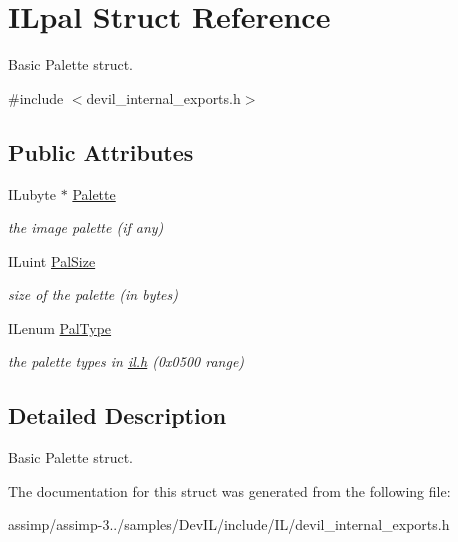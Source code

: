 \hypertarget{struct_i_lpal}{\section{I\+Lpal Struct Reference}
\label{struct_i_lpal}
}


Basic Palette struct.  




{\ttfamily \#include $<$devil\+\_\+internal\+\_\+exports.\+h$>$}

\subsection*{Public Attributes}
\begin{DoxyCompactItemize}
\item 
\hypertarget{struct_i_lpal_abc8ce06b53b2ca4de6bf2ebda303d746}{I\+Lubyte $\ast$ \hyperlink{struct_i_lpal_abc8ce06b53b2ca4de6bf2ebda303d746}{Palette}}\label{struct_i_lpal_abc8ce06b53b2ca4de6bf2ebda303d746}

\begin{DoxyCompactList}\small\item\em the image palette (if any) \end{DoxyCompactList}\item 
\hypertarget{struct_i_lpal_a0e64a8c7d3cdd2e63b60c947f118db9b}{I\+Luint \hyperlink{struct_i_lpal_a0e64a8c7d3cdd2e63b60c947f118db9b}{Pal\+Size}}\label{struct_i_lpal_a0e64a8c7d3cdd2e63b60c947f118db9b}

\begin{DoxyCompactList}\small\item\em size of the palette (in bytes) \end{DoxyCompactList}\item 
\hypertarget{struct_i_lpal_a586f4c7d59e6f202e1d63c67f7679c23}{I\+Lenum \hyperlink{struct_i_lpal_a586f4c7d59e6f202e1d63c67f7679c23}{Pal\+Type}}\label{struct_i_lpal_a586f4c7d59e6f202e1d63c67f7679c23}

\begin{DoxyCompactList}\small\item\em the palette types in \hyperlink{il_8h}{il.\+h} (0x0500 range) \end{DoxyCompactList}\end{DoxyCompactItemize}


\subsection{Detailed Description}
Basic Palette struct. 

The documentation for this struct was generated from the following file\+:\begin{DoxyCompactItemize}
\item 
assimp/assimp-\/3../samples/\+Dev\+I\+L/include/\+I\+L/devil\+\_\+internal\+\_\+exports.\+h\end{DoxyCompactItemize}
